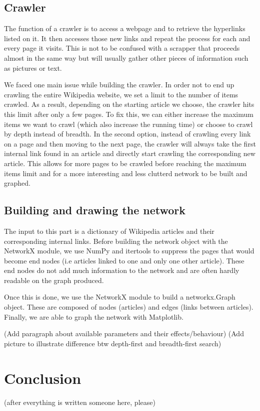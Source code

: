 \documentclass[10pt]{article}
\begin{document}
	\subsection{Crawler}
	The function of a crawler is to access a webpage and to retrieve the hyperlinks listed on it. It then accesses those new links and repeat the process for each and every page it visits. This is not to be confused with a scrapper that proceeds almost in the same way but will usually gather other pieces of information such as pictures or text. \par \noindent
We faced one main issue while building the crawler. In order not to end up crawling the entire Wikipedia website, we set a limit to the number of items crawled. As a result, depending on the starting article we choose, the crawler hits this limit after only a few pages. To fix this, we can either increase the maximum items we want to crawl (which also increase the running time) or choose to crawl by depth instead of breadth. In the second option, instead of crawling every link on a page and then moving to the next page, the crawler will always take the first internal link found in an article and directly start crawling the corresponding new article. This allows for more pages to be crawled before reaching the maximum items limit and for a more interesting and less clutterd network to be built and graphed.
	
	\subsection{Building and drawing the network}
	The input to this part is a dictionary of Wikipedia articles and their corresponding internal links. Before building the network object with the NetworkX module, we use NumPy and itertools to suppress the pages that would become end nodes (i.e articles linked to one and only one other article). These end nodes do not add much information to the network and are often hardly readable on the graph produced. \par \noindent
Once this is done, we use the NetworkX module to build a networkx.Graph object. These are composed of nodes (articles) and edges (links between articles). Finally, we are able to graph the network with Matplotlib. \par \noindent

(Add paragraph about available parameters and their effects/behaviour)
(Add picture to illustrate difference btw depth-first and breadth-first search)
	
\section{Conclusion}

(after everything is written someone here, please)



\newpage
 

\end{document}

